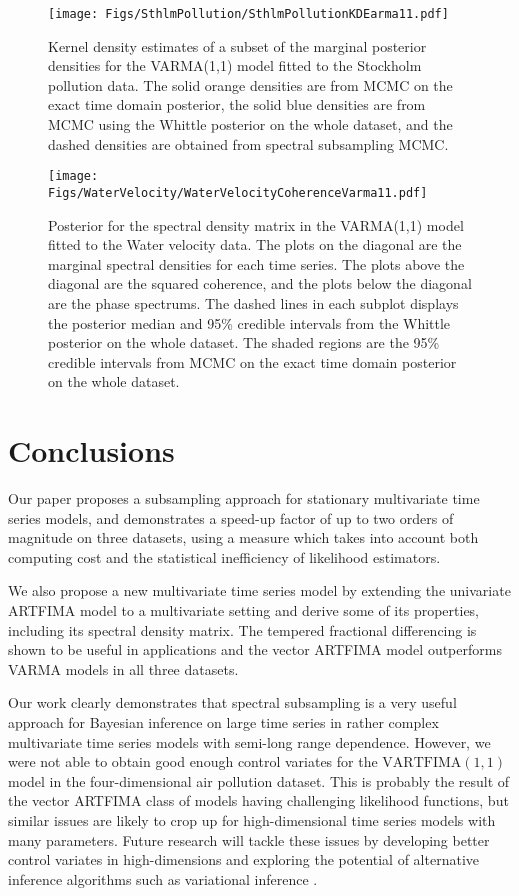 \documentclass[11pt,english,oneside]{amsart}
\numberwithin{equation}{section}
\theoremstyle{plain}
\numberwithin{equation}{section}
\begin{document}
\begin{figure}
    \texttt{[image: Figs/SthlmPollution/SthlmPollutionKDEarma11.pdf]}
    \caption{Kernel density estimates of a subset of the marginal posterior densities for the VARMA(1,1) model fitted to the Stockholm pollution data. The solid orange densities are from MCMC on the exact time domain posterior, the solid blue densities are from MCMC using the Whittle posterior on the whole dataset, and the dashed densities are obtained from spectral subsampling MCMC.}\label{fig:SthlmPollutionKDEarma11}
\end{figure}

\begin{figure}
    \texttt{[image: Figs/WaterVelocity/WaterVelocityCoherenceVarma11.pdf]}
    \caption{Posterior for the spectral density matrix in the VARMA(1,1) model fitted to the Water velocity data. The plots on the diagonal are the marginal spectral densities for each time series. The plots above the diagonal are the squared coherence, and the plots below the diagonal are the phase spectrums. The dashed lines in each subplot displays the posterior median and 95\% credible intervals from the Whittle posterior on the whole dataset. The shaded regions are the 95\% credible intervals from MCMC on the exact time domain posterior on the whole dataset.}\label{fig:WaterVelocityCoherenceVarma}
\end{figure}


\section{Conclusions}\label{sec:Conclusions}
Our paper proposes a subsampling approach for stationary multivariate time series models, and demonstrates a speed-up factor of up to two orders of magnitude on three datasets, using a measure which takes into account both computing cost and the statistical inefficiency of likelihood estimators. 

We also propose a new multivariate time series model by extending the univariate ARTFIMA model to a multivariate setting and derive some of its properties, including its spectral density matrix. The tempered fractional differencing is shown to be useful in applications and the vector ARTFIMA model outperforms VARMA models in all three datasets. 

Our work clearly demonstrates that spectral subsampling is a very useful approach for Bayesian inference on large time series in rather complex multivariate time series models with semi-long range dependence. However, we were not able to obtain good enough control variates for the $\mathrm{VARTFIMA}(1,1)$ model in the four-dimensional air pollution dataset. This is probably the result of the vector ARTFIMA class of models having challenging likelihood functions, but similar issues are likely to crop up for high-dimensional time series models with many parameters. Future research will tackle these issues by developing better control variates in high-dimensions and exploring the potential of alternative inference algorithms such as variational inference \citep{blei2017variational}.
\end{document}
